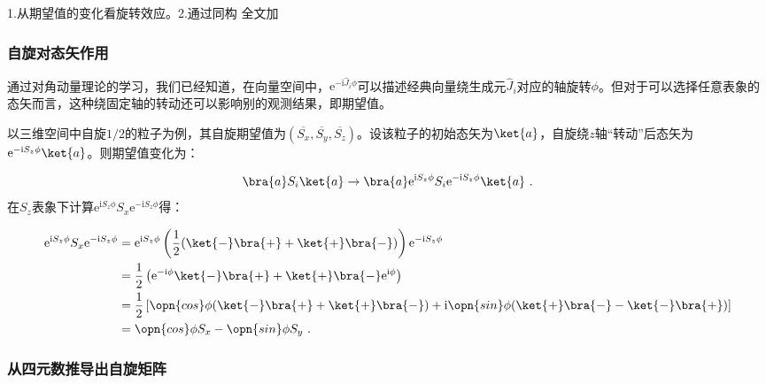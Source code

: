 
\begin{issues}
\issueDraft
1.从期望值的变化看旋转效应。2.通过同构
全文加\hat
\end{issues}

\subsubsection{自旋对态矢作用}
 通过对角动量理论的学习，我们已经知道，在向量空间中，$\mathrm e^{-\mathrm i\hat J_i\phi}$可以描述经典向量绕生成元$\hat J_i$对应的轴旋转$\phi$。但对于可以选择任意表象的态矢而言，这种绕固定轴的转动还可以影响别的观测结果，即期望值。

以三维空间中自旋$1/2$的粒子为例，其自旋期望值为$(\overline{S_x},\overline{S_y},\overline{S_z})$。设该粒子的初始态矢为$\ket{a}$，自旋绕$z$轴“转动”后态矢为$\mathrm e^{-\mathrm i S_z\phi}\ket{a}$。则期望值变化为：

\begin{equation}
\bra{a}S_i\ket{a}\rightarrow \bra{a}\mathrm e^{\mathrm i S_z\phi}S_i\mathrm e^{-\mathrm i S_z\phi}\ket{a}~.
\end{equation}
在$S_z$表象下计算$\mathrm e^{\mathrm i S_z\phi}S_x\mathrm e^{-\mathrm i S_z\phi}$得：

\begin{equation}
\begin{aligned}
\mathrm e^{\mathrm i S_z\phi}S_x\mathrm e^{-\mathrm i S_z\phi}&=\mathrm e^{\mathrm i S_z\phi}\left(\frac{1}{2}(\ket{-}\bra{+}+\ket{+}\bra{-})\right)\mathrm e^{-\mathrm i S_z\phi}\\
 &=\frac{1}{2}\left(\mathrm e^{-\mathrm i \phi}\ket{-}\bra{+}+\ket{+}\bra{-}\mathrm e^{\mathrm i \phi}\right)\\
 &=\frac{1}{2}\left[\opn{cos}\phi(\ket{-}\bra{+}+\ket{+}\bra{-})+\mathrm i\opn{sin}\phi(\ket{+}\bra{-}-\ket{-}\bra{+})\right]\\
 &=\opn{cos}\phi S_x-\opn{sin}\phi S_y~.
\end{aligned}
\end{equation}

\subsubsection{从四元数推导出自旋矩阵}
